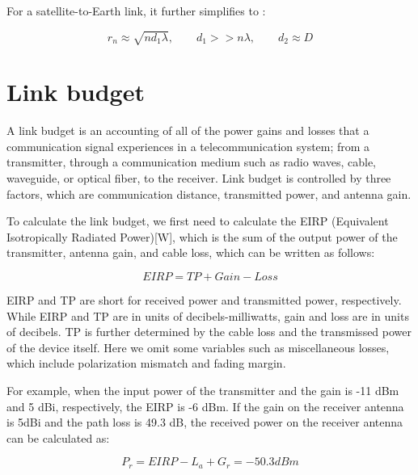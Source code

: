 \documentclass[a4paper,12pt]{report}
\begin{document}
For a satellite-to-Earth link, it further simplifies to \cite{inbook}:

\begin{equation}
  r_n \approx \sqrt{n d_1 \lambda}, \qquad d_1 >> n\lambda, \qquad d_2 \approx D
\end{equation}


\section{Link budget}

A link budget is an accounting of all of the power gains and losses
that a communication signal experiences in a telecommunication system;
from a transmitter, through a communication medium such as radio waves,
cable, waveguide, or optical fiber, to the receiver.
Link budget is controlled by three factors, 
which are communication distance, transmitted power, and antenna gain.

To calculate the link budget,
we first need to calculate the EIRP (Equivalent Isotropically Radiated Power)[W],
which is the sum of the output power of the transmitter, antenna gain, and cable loss,
which can be written as follows:

\begin{equation}
  EIRP = TP + Gain - Loss
\end{equation}

EIRP and TP are short for received power and transmitted power, respectively.
While EIRP and TP are in units of decibels-milliwatts,
gain and loss are in units of decibels.
TP is further determined by the cable loss and the transmissed power
of the device itself.
Here we omit some variables such as miscellaneous losses,
which include polarization mismatch and fading margin.

For example, when the input power of the transmitter and the gain is -11 dBm and 5 dBi,
respectively, the EIRP is -6 dBm.
If the gain on the receiver antenna is 5dBi and
the path loss is 49.3 dB,
the received power on the receiver antenna can be calculated as:

\begin{equation}
  P_r = EIRP - L_{a} + G_r = -50.3 dBm
\end{equation}
\end{document}
